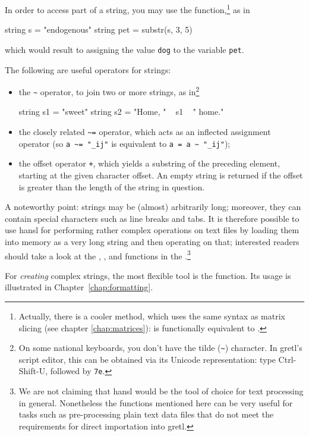In order to access part of a string, you may use the 
function,\footnote{Actually, there is a cooler method, which uses the
  same syntax as matrix slicing (see chapter \ref{chap:matrices}):
   is functionally equivalent to .} as in
\begin{code}
  string s = "endogenous"
  string pet = substr(s, 3, 5)
\end{code}
which would result to assigning the value \texttt{dog} to the variable
\texttt{pet}.

The following are useful operators for strings:
\begin{itemize}
\item the \verb|~| operator, to join two or more strings, as
  in\footnote{On some national keyboards, you don't have the tilde
    (\texttt{\~}) character. In gretl's script editor, this can be
    obtained via its Unicode representation: type Ctrl-Shift-U,
    followed by \texttt{7e}.}
  \begin{code}
    string s1 = "sweet"
    string s2 = "Home, " ~ s1 ~ " home."
  \end{code}
\item the closely related \verb|~=| operator, which acts as an
  inflected assignment operator (so \verb|a ~= "_ij"| is equivalent to
  \verb|a = a ~ "_ij"|);
\item the offset operator \texttt{+}, which yields a substring of the
  preceding element, starting at the given character offset.  An empty
  string is returned if the offset is greater than the length of the
  string in question.
\end{itemize}

A noteworthy point: strings may be (almost) arbitrarily long;
moreover, they can contain special characters such as line breaks and
tabs. It is therefore possible to use hansl for performing rather
complex operations on text files by loading them into memory as a very
long string and then operating on that; interested readers should take
a look at the , ,  and
 functions in the \GCR.\footnote{We are not claiming that
  hansl would be the tool of choice for text processing in
  general. Nonetheless the functions mentioned here can be very useful
  for tasks such as pre-processing plain text data files that do not
  meet the requirements for direct importation into gretl.}

For \emph{creating} complex strings, the most flexible tool is the
 function. Its usage is illustrated in
Chapter~\ref{chap:formatting}.


